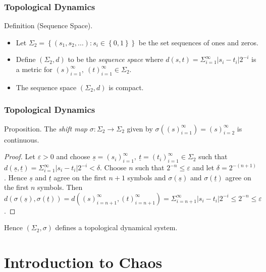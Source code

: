 \documentclass{beamer}
\begin{document}
\begin{frame}
    \frametitle{Topological Dynamics}
    \begin{block}{Definition (Sequence Space).}
        \begin{itemize}
            \item Let $\Sigma_2 = \left\lbrace (s_1, s_2, \dots): s_i \in \left\lbrace 0, 1 \right\rbrace \right\rbrace$ be the set sequences of ones and zeros.
            \item Define $(\Sigma_2, d)$ to be the \emph{sequence space} where $d(s, t) = \Sigma_{i=1}^{\infty}|s_i - t_i|2^{-i}$ is a metric for $(s)_{i=1}^{\infty}, \ (t)_{i=1}^{\infty}  \in \Sigma_2$.
            \item The sequence space $(\Sigma_2, d)$ is compact.
        \end{itemize}
    \end{block}
\end{frame}

\begin{frame}
    \frametitle{Topological Dynamics}
    \begin{block}{Proposition.}
        The \emph{shift map} $\sigma: \Sigma_2 \to \Sigma_2$ given by $\sigma \left((s)_{i=1}^{\infty}\right) = (s)_{i=2}^{\infty}$ is continuous.
        \begin{proof}
            Let $\varepsilon > 0$ and choose $\underline{s} = (s_i)_{i=1}^{\infty}, \ \underline{t} = (t_i)_{i=1}^{\infty} \in \Sigma_2$ such that $d(\underline{s}, \underline{t}) = \Sigma_{i=1}^{\infty}|s_i - t_i|2^{-i} < \delta$. Choose $n$ such that $2^{-n} \leq \varepsilon$ and let $\delta = 2^{-(n+1)}$. Hence $\underline{s}$ and $\underline{t}$ agree on the first $n+1$ symbols and $\sigma\left(\underline{s}\right)$ and $\sigma\left(\underline{t}\right)$ agree on the first $n$ symbols. Then $d\left( \sigma\left(\underline{s}\right), \sigma\left(\underline{t}\right) \right) = d\left((s)_{i=n+1}^{\infty}, (t)_{i=n+1}^{\infty}\right) = \Sigma_{i=n+1}^{\infty}|s_i - t_i|2^{-i} \leq 2^{-n} \leq \varepsilon$.
        \end{proof}
    \end{block}
    \vspace{0.5cm}
    Hence $(\Sigma_2, \sigma)$ defines a topological dynamical system.
\end{frame}

\section{Introduction to Chaos}
\end{document}
